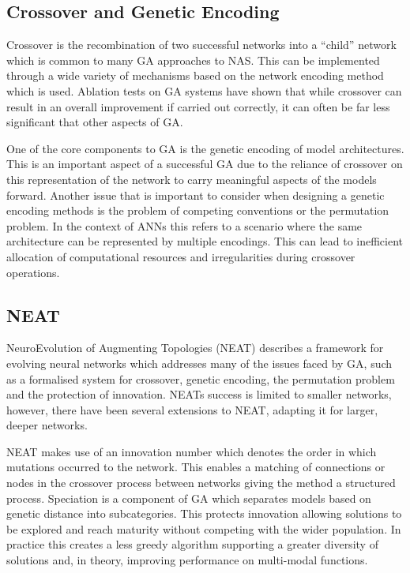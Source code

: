 \documentclass{article}
\begin{document}
\subsection{Crossover and Genetic Encoding}

Crossover is the recombination of two successful networks into a “child” network which is common to many GA approaches to NAS. \cite{3}\cite{24}\cite{5} This can be implemented through a wide variety of mechanisms based on the network encoding method which is used. Ablation tests on GA systems have shown that while crossover can result in an overall improvement if carried out correctly, it can often be far less significant that other aspects of GA. \cite{5}\cite{24}

\par

One of the core components to GA is the genetic encoding of model architectures. This is an important aspect of a successful GA due to the reliance of crossover on this representation of the network to carry meaningful aspects of the models forward. \cite{24} Another issue that is important to consider when designing a genetic encoding methods is the problem of competing conventions or the permutation problem\cite{38}\cite{24}. In the context of ANNs this refers to a scenario where the same architecture can be represented by multiple encodings. This can lead to inefficient allocation of computational resources and irregularities during crossover operations. \cite{24}


\subsection{NEAT}


NeuroEvolution of Augmenting Topologies (NEAT) \cite{24} describes a framework for evolving neural networks which addresses many of the issues faced by GA, such as a formalised system for crossover, genetic encoding, the permutation problem and the protection of innovation. NEATs success is limited to smaller networks, however, there have been several extensions to NEAT, adapting it for larger, deeper networks. \cite{44}\cite{25}

NEAT makes use of an innovation number which denotes the order in which mutations occurred to the network. This enables a matching of connections or nodes in the crossover process between networks giving the method a structured process. Speciation is a component of GA which separates models based on genetic distance into subcategories. This protects innovation allowing solutions to be explored and reach maturity without competing with the wider population. In practice this creates a less greedy algorithm supporting a greater diversity of solutions and, in theory, improving performance on multi-modal functions. 
\end{document}
